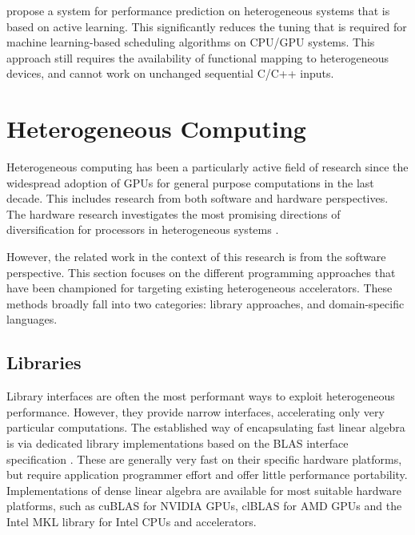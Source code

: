     \citet{Ogilvie:2014:ALA:2628071.2628128} propose a system for performance
    prediction on heterogeneous systems that is based on active learning.
    This significantly reduces the tuning that is required for
    machine learning-based scheduling algorithms on CPU/GPU systems.
    This approach still requires the availability of functional mapping
    to heterogeneous devices, and cannot work on unchanged sequential C/C++
    inputs.

\section{Heterogeneous Computing}

    Heterogeneous computing has been a particularly active field of research
    since the widespread adoption of GPUs for general purpose computations in
    the last decade.
    This includes research from both software and hardware perspectives.
    The hardware research investigates the most promising directions of
    diversification for processors in heterogeneous systems
    \citep{Tomusk:2016:SHC:3012405.3014165}.

    However, the related work in the context of this research is from
    the software perspective.
    This section focuses on the different programming approaches that
    have been championed for targeting existing heterogeneous accelerators.
    These methods broadly fall into two categories: library approaches, and
    domain-specific languages.

\subsection{Libraries}

    Library interfaces are often the most performant ways to exploit
    heterogeneous performance.
    However, they provide narrow interfaces, accelerating only very particular
    computations.
    The established way of encapsulating fast linear algebra is via dedicated
    library implementations based on the BLAS interface specification
    \cite{2002:USB:567806.567807}.
    These are generally very fast on their specific hardware platforms, but
    require application programmer effort and offer little performance portability.
    Implementations of dense linear algebra are available for most suitable
    hardware platforms, such as cuBLAS \cite{cublas} for NVIDIA GPUs, clBLAS
    \cite{clblas} for AMD GPUs and the Intel MKL library \cite{mkl} for Intel
    CPUs and accelerators.


